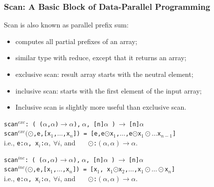 \documentclass{beamer}
\renewcommand{\emph}[1]{\textcolor{CosGreen}{ #1}}
\newcommand{\emp}[1]{\textcolor{DikuRed}{ #1}}
\begin{document}
\begin{frame}[fragile,t]
  \frametitle{Scan: A Basic Block of Data-Parallel Programming}

Scan is also known as parallel prefix sum:
\begin{itemize}
\item computes all partial prefixes of an array;
\item similar type with reduce, except that it returns an array;\medskip
\item \emp{exclusive scan}: result array starts with the neutral element;
\item \emph{inclusive scan}: starts with the first element of the input array;\medskip
\item Inclusive scan is slightly more useful than exclusive scan.
\end{itemize}\bigskip\pause

\emp{{\tt scan$^{exc}$: ( ($\alpha$,$\alpha$)$\rightarrow\alpha$),$~\alpha$, [n]$\alpha$ )$~\rightarrow~$[n]$\alpha$}}\\
        \emph{\tt scan$^{exc}(\odot$,e,[x$_1$,$\ldots$,x$_n$])~=~[e,e$\odot$x$_1$,$\ldots$,e$\odot$x$_1\odot\ldots$x$_{n-1}$]}\\
        i.e., \emp{{\tt{}e:$\alpha$, x$_i$:$\alpha,~\forall i$}}, and 
        \emp{\tt~~~$\odot$:$(\alpha,\alpha)\rightarrow\alpha$}.\bigskip

\emp{{\tt scan$^{inc}$: ( ($\alpha$,$\alpha$)$\rightarrow\alpha$),$~\alpha$, [n]$\alpha$ )$~\rightarrow~$[n]$\alpha$}}\\
        \emph{\tt scan$^{inc}(\odot$,e,[x$_1$,$\ldots$,x$_n$])~=~[x$_1$,~x$_1$$\odot$x$_2$,$\ldots$,x$_1\odot\ldots\odot$x$_{n}$]}\\
        i.e., \emp{{\tt{}e:$\alpha$, x$_i$:$\alpha,~\forall i$}}, and 
        \emp{\tt~~~$\odot$:$(\alpha,\alpha)\rightarrow\alpha$}.

\end{frame}
\end{document}
